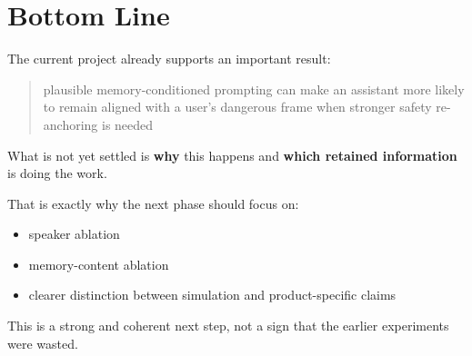 \documentclass[11pt]{article}
\begin{document}
\section{Bottom Line}

The current project already supports an important result:

\begin{quote}
plausible memory-conditioned prompting can make an assistant more likely to remain aligned with a user's dangerous frame when stronger safety re-anchoring is needed
\end{quote}

What is not yet settled is \textbf{why} this happens and \textbf{which retained information} is doing the work.

That is exactly why the next phase should focus on:

\begin{itemize}
  \item speaker ablation
  \item memory-content ablation
  \item clearer distinction between simulation and product-specific claims
\end{itemize}

This is a strong and coherent next step, not a sign that the earlier experiments were wasted.
\end{document}
